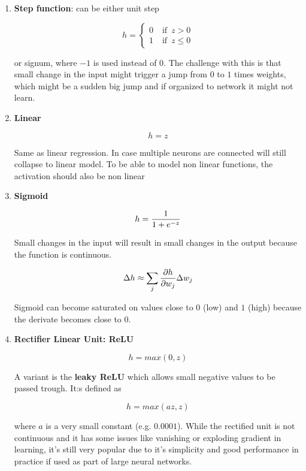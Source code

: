 \begin{enumerate}
    \item \textbf{Step function}: can be either unit step

\[h = \begin{cases}
0 & \operatorname{if }\ z > 0 \\
1 & \operatorname{if }\ z \le 0
\end{cases}
\]

or signum, where \(-1\) is used instead of \(0\). The challenge with this is that small change in the input might trigger a jump from \(0\) to \(1\) times weights, which might be a sudden big jump and if organized to network it might not learn.

    \item \textbf{Linear}

\[h = z \]

Same as linear regression. In case multiple neurons are connected will still collapse to linear model. To be able to model non linear functions, the activation should also be non linear

    \item \textbf{Sigmoid}

\[h = {1 \over 1 + e^{-z}}\]

Small changes in the input will result in small changes in the output because the function is continuous.

\[\Delta h \approx \sum_j {\partial h \over \partial w_j} \Delta w_j \]

Sigmoid can become saturated on values close to \(0\) (low) and \(1\) (high) because the derivate becomes close to \(0\).

    \item \textbf{Rectifier Linear Unit: ReLU}

\[h = max(0, z)\]

A variant is the \textbf{leaky ReLU} which allows small negative values to be passed trough. It:s defined as

\[h = max(az, z)\]

where \(a\) is a very small constant (e.g. \(0.0001\)). While the rectified unit is not continuous and it has some issues like vanishing or exploding gradient in learning, it's still very popular due to it's simplicity and good performance in practice if used as part of large neural networks.
\end{enumerate}

